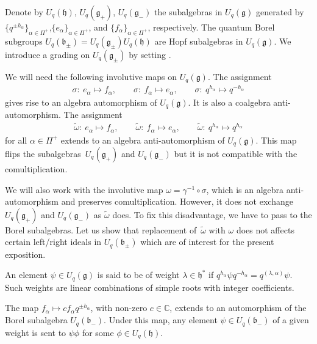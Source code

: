 Denote by $U_q(\mathfrak{h})$, $U_q(\mathfrak{g}_+)$, $U_q(\mathfrak{g}_-)$ the subalgebras in $U_q(\mathfrak{g})$ generated by $\big\{q^{\pm h_\alpha}\big\}_{\alpha\in \Pi^+}$,\linebreak $\{e_\alpha\}_{\alpha\in \Pi^+}$, and $\{f_\alpha\}_{\alpha\in \Pi^+}$, respectively. The quantum Borel subgroups $U_q(\mathfrak{b}_\pm)=U_q(\mathfrak{g}_\pm)U_q(\mathfrak{h})$ are Hopf subalgebras in $U_q\!(\mathfrak{g})$. We introduce a grading on $U_q\!(\mathfrak{g}_\pm\!)$ by setting .

We will need the following involutive maps on $U_q(\mathfrak{g})$.
The assignment
\begin{gather*}
\sigma\colon \ e_\alpha\mapsto f_\alpha, \qquad\sigma\colon \ f_\alpha\mapsto e_\alpha, \qquad \sigma\colon \ q^{h_\alpha}\mapsto q^{-h_\alpha}
\end{gather*}
gives rise to an algebra automorphism of $U_q(\mathfrak{g})$. It is also a coalgebra anti-automorphism. The assignment
\begin{gather*}
\tilde \omega\colon \ e_\alpha\mapsto f_\alpha, \qquad\tilde \omega\colon \ f_\alpha\mapsto e_\alpha, \qquad \tilde \omega\colon \ q^{h_\alpha}\mapsto q^{h_\alpha}
\end{gather*}
for all $\alpha \in \Pi^+$ extends to an algebra anti-automorphism of $U_q(\mathfrak{g})$. This map flips the subalgebras~$U_q(\mathfrak{g}_+)$ and $U_q(\mathfrak{g}_-)$ but it is not compatible with the comultiplication.

We will also work with the involutive map $\omega =\gamma^{-1}\circ \sigma$, which is an algebra anti-automorphism and preserves comultiplication. However, it does not exchange $U_q(\mathfrak{g}_+)$ and $U_q(\mathfrak{g}_-)$ as $\tilde \omega$ does. To fix this disadvantage, we have to pass to the Borel subalgebras. Let us show that replacement of~$\tilde \omega$ with $\omega$ does not affects certain left/right ideals in $U_q(\mathfrak{b}_\pm)$ which are of interest for the present exposition.

An element $\psi\in U_q(\mathfrak{g})$ is said to be of weight $\lambda\in \mathfrak{h}^*$ if $q^{h_\alpha}\psi q^{-h_\alpha}=q^{(\lambda,\alpha)}\psi$. Such weights are linear combinations of simple roots with integer coefficients.

\begin{Lemma}\label{eq-ideals} The map $f_{\alpha}\mapsto c f_{\alpha}q^{\pm h_\alpha}$, with non-zero $c\in \mathbb{C}$, extends to an automorphism of the Borel subalgebra $U_q(\mathfrak{b}_-)$. Under this map, any element $\psi\in U_q(\mathfrak{b}_-)$ of a given weight is sent to $\psi \phi$ for some $\phi\in U_q(\mathfrak{h})$.
\end{Lemma}

